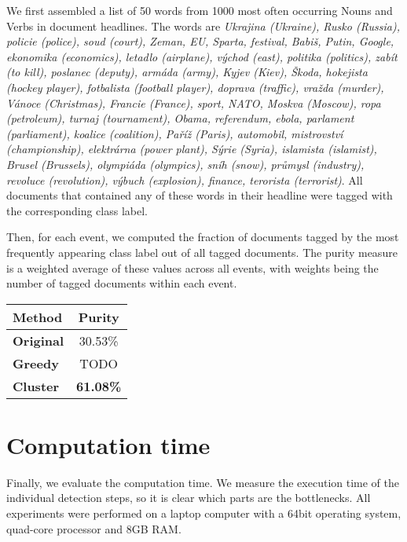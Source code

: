 We first assembled a list of 50 words from 1000 most often occurring Nouns and Verbs in document headlines. The words are \textit{Ukrajina (Ukraine), Rusko (Russia), policie (police), soud (court), Zeman, EU, Sparta, festival, Babiš, Putin, Google, ekonomika (economics), letadlo (airplane), východ (east), politika (politics), zabít (to kill), poslanec (deputy), armáda (army), Kyjev (Kiev), Škoda, hokejista (hockey player), fotbalista (football player), doprava (traffic), vražda (murder), Vánoce (Christmas), Francie (France), sport, NATO, Moskva (Moscow), ropa (petroleum), turnaj (tournament), Obama, referendum, ebola, parlament (parliament), koalice (coalition), Paříž (Paris), automobil, mistrovství (championship), elektrárna (power plant), Sýrie (Syria), islamista (islamist), Brusel (Brussels), olympiáda (olympics), sníh (snow), průmysl (industry), revoluce (revolution), výbuch (explosion), finance, terorista (terrorist)}. All documents that contained any of these words in their headline were tagged with the corresponding class label.

Then, for each event, we computed the fraction of documents tagged by the most frequently appearing class label out of all tagged documents. The purity measure is a weighted average of these values across all events, with weights being the number of tagged documents within each event.

\hspace{\fill}

\begin{minipage}{\linewidth}
\centering
\begin{tabular}{ l c }\toprule[1.5pt]
\bf Method 	 & \bf Purity \\ \midrule
\bf Original &  30.53\% \\
\bf Greedy   &  {\color{red} TODO} \\
\bf Cluster &  \bf 61.08\% \\ \bottomrule[1.25pt]
\end {tabular}\par
{} \label{tab:title} 
\end{minipage}

\hspace{\fill}

\section{Computation time}

Finally, we evaluate the computation time. We measure the execution time of the individual detection steps, so it is clear which parts are the bottlenecks. All experiments were performed on a laptop computer with a 64bit operating system, quad-core processor and 8GB RAM.

